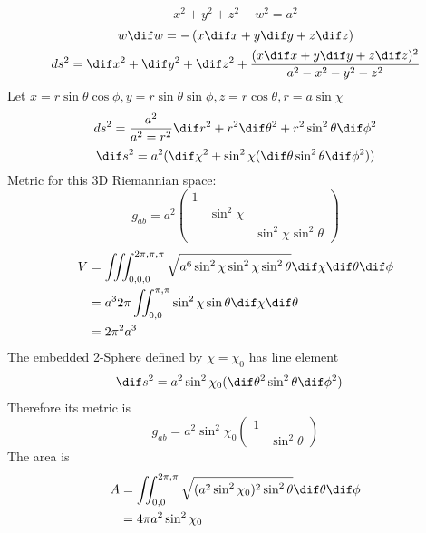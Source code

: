 \documentclass[12pt]{article}
\begin{document}
        \subsection{} \[
            x^2 + y^2 + z^2 + w^2 = a^2\]
        \begin{gather*}
            w \dif w = - \left(x\dif x + y \dif y + z \dif z  \right)\\
            ds^2 = \dif x^2 + \dif y^2 + \dif z^2 +\frac{(x\dif x + y\dif y + z\dif z)^2}{a^2 - x^2 - y^2 - z^2} 
        \end{gather*}
        Let \(x = r\sin \theta \cos \phi, y = r \sin\theta \sin \phi, z = r\cos \theta, r = a \sin \chi\)
        \[ds^2 = \frac{a^2}{a^2 = r^2}\dif r^2 + r^2 \dif\theta^2 + r^2\sin^2\theta \dif\phi^2\]
        \[\dif s^2 = a^2(\dif \chi^2 + \sin^2\chi(\dif\theta \sin^2 \theta \dif \phi^2))\]
        Metric for this 3D Riemannian space:
        \[
            g_{ab} = a^2 \begin{pmatrix} 1&&\\
            &\sin^2\chi&\\
            &&\sin^2 \chi \sin^2 \theta
         \end{pmatrix} \]
        \begin{align*}
             V &= \iiint_{0,0,0}^{2\pi,\pi,\pi}\sqrt{a^6\sin^2\chi\sin^2\chi\sin^2\theta}\dif\chi \dif\theta \dif\phi\\
             &= a^3 2\pi \iint_{0,0}^{\pi,\pi} \sin^2\chi \sin \theta \dif \chi \dif \theta\\
             &= 2\pi^2a^3 
        \end{align*}
        The embedded 2-Sphere defined by \(\chi = \chi_0\) has line element
        \begin{align*}
            \dif s^2 &= a^2 \sin^2 \chi_0(\dif\theta^2 \sin^2 \theta \dif \phi^2)
        \end{align*}
        Therefore its metric is \[g_{ab} = a^2\sin^2\chi_0 \begin{pmatrix} 1&\\
        &\sin^2\theta \end{pmatrix} \]
        The area is 
        \begin{align*}
            A &= \iint_{0,0}^{2\pi,\pi}\sqrt{(a^2\sin^2\chi_0)^2\sin^2\theta}\dif \theta \dif \phi\\
            &= 4\pi a^2 \sin^2\chi_0 
        \end{align*}
\newpage
\section{}
\end{document}
